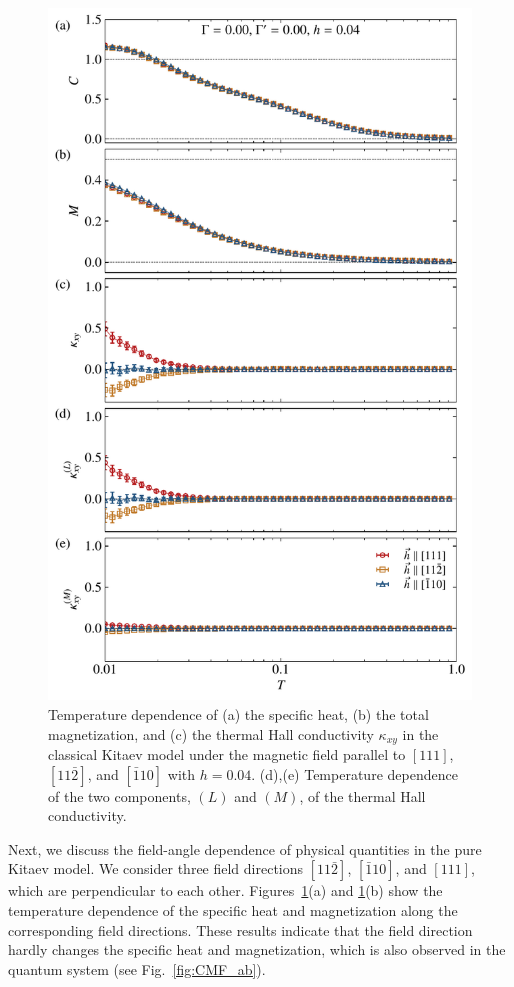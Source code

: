 \documentclass[twocolumn,superscriptaddress,showpacs, longbibliography, aps, prb]{revtex4-2}
\newcommand{\red}[1]{\textcolor{red}{#1}}
\newcommand{\blue}[1]{\textcolor{blue}{#1}}
\begin{document}
\begin{figure}[tbh] 
\begin{center} 
\includegraphics[width=0.9\linewidth]{Figs/fig_K-1.0_G0.00_Gp0.00_h0.04.pdf}
\vspace{-0.5cm} 
\caption{Temperature dependence of (a) the specific heat, (b) the total magnetization, and
(c) the thermal Hall conductivity $\kappa_{xy}$ in the classical Kitaev model under the magnetic field parallel to $[111]$, $[11\bar{2}]$, and $[\bar{1}10]$ with $h=0.04$.
(d),(e) Temperature dependence of the two components, $(L)$ and $(M)$, of the thermal Hall conductivity.}
\label{fig_classical_adep004}
\end{center}
\end{figure}
  
Next, we discuss the field-angle dependence of physical quantities in the pure Kitaev model. We consider %
three field directions $[11\bar{2}]$, $[\bar{1}10]$, and $[111]$, which are perpendicular to each other.
Figures~\ref{fig_classical_adep004}(a) and \ref{fig_classical_adep004}(b) show the temperature dependence of the specific heat and magnetization along the corresponding field %
directions.
These results indicate that the field direction hardly changes the specific heat and magnetization, which is also observed in the quantum system (see Fig.~\ref{fig:CMF_ab}). 
\end{document}
